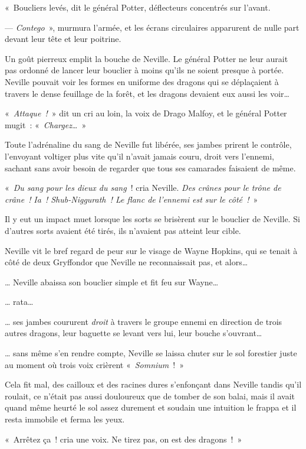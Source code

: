 «~Boucliers levés, dit le général Potter, déflecteurs concentrés sur l'avant.

--- \emph{Contego}~», murmura l'armée, et les écrans circulaires apparurent de nulle part devant leur tête et leur poitrine.

Un goût pierreux emplit la bouche de Neville. Le général Potter ne leur aurait pas ordonné de lancer leur bouclier à moins qu'ils ne soient presque à portée. Neville pouvait voir les formes en uniforme des dragons qui se déplaçaient à travers le dense feuillage de la forêt, et les dragons devaient eux aussi les voir…

«~\emph{Attaque~!}~» dit un cri au loin, la voix de Drago Malfoy, et le général Potter mugit~: «~\emph{Chargez…}~»

Toute l'adrénaline du sang de Neville fut libérée, ses jambes prirent le contrôle, l'envoyant voltiger plus vite qu'il n'avait jamais couru, droit vers l'ennemi, sachant sans avoir besoin de regarder que tous ses camarades faisaient de même.

«~\emph{Du sang pour les dieux du sang}~! cria Neville. \emph{Des crânes pour le trône de crâne~!} \emph{Ia~! Shub-Niggurath~! Le flanc de l'ennemi est sur le côté~!}~»

Il y eut un impact muet lorsque les sorts se brisèrent sur le bouclier de Neville. Si d'autres sorts avaient été tirés, ils n'avaient pas atteint leur cible.

Neville vit le bref regard de peur sur le visage de Wayne Hopkins, qui se tenait à côté de deux Gryffondor que Neville ne reconnaissait pas, et alors…

… Neville abaissa son bouclier simple et fit feu sur Wayne…

… rata…

… ses jambes coururent \emph{droit} à travers le groupe ennemi en direction de trois autres dragons, leur baguette se levant vers lui, leur bouche s'ouvrant…

… sans même s'en rendre compte, Neville se laissa chuter sur le sol forestier juste au moment où trois voix crièrent «~\emph{Somnium}~!~»

Cela fit mal, des cailloux et des racines dures s'enfonçant dans Neville tandis qu'il roulait, ce n'était pas aussi douloureux que de tomber de son balai, mais il avait quand même heurté le sol assez durement et soudain une intuition le frappa et il resta immobile et ferma les yeux.

«~Arrêtez ça~! cria une voix. Ne tirez pas, on est des dragons~!~»

